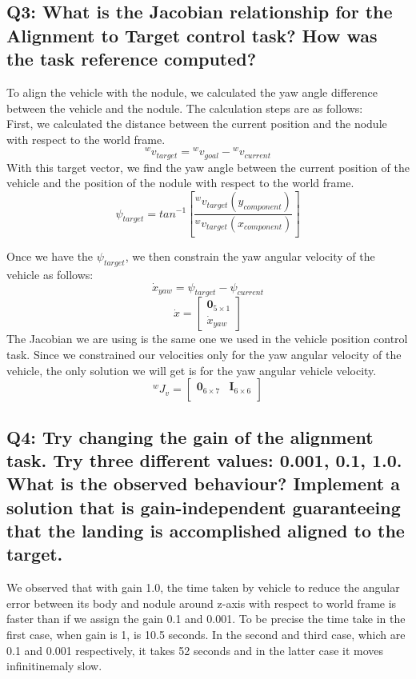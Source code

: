 \documentclass{article}
\begin{document}
\subsection{Q3: What is the Jacobian relationship for the Alignment to Target control task? How was the task reference computed?}
To align the vehicle with the nodule, we calculated the yaw angle difference between the vehicle and the nodule. The calculation steps are as follows:
\\ First, we calculated the distance between the current position and the nodule with respect to the world frame.
$${}^{w}v_{target} = {}^{w}v_{goal} - {}^{w}v_{current} $$  %
\noindent
With this target vector, we find the yaw angle between the current position of the vehicle and the position of the nodule with respect to the world frame. \\
$$\psi_{target} = tan^{-1}\left[\frac{{}^{w}v_{target}(y_{component})}{{}^{w}v_{target}(x_{component})}\right]$$ %

Once we have the $\psi_{target}$, we then constrain the yaw angular velocity of the vehicle as follows:
$$\dot{x}_{yaw}=\psi_{target}-\psi_{current}$$
$$\dot{x} = \begin{bmatrix}
		\mathbf{0}_{5 \times 1} \\ \dot{x}_{yaw}
		\end{bmatrix} $$
The Jacobian we are using is the same one we used in the vehicle position control task. Since we constrained our velocities only for the yaw angular velocity of the vehicle, the only solution we will get is for the yaw angular vehicle velocity. 
$${}^{w}J_v = \begin{bmatrix}
		\mathbf{0}_{6 \times 7} & \mathbf{I}_{6 \times 6} \\
		\end{bmatrix} $$
\subsection{Q4: Try changing the gain of the alignment task. Try three different values: 0.001, 0.1, 1.0. What is the observed behaviour? Implement a solution that is gain-independent guaranteeing that the landing is accomplished aligned to the target.}
We observed that with gain 1.0, the time taken by vehicle to reduce the angular error between its body and nodule around z-axis with respect to world frame is faster than if we assign the gain 0.1 and 0.001. To be precise the time take in the first case, when gain is 1, is 10.5 seconds. In the second and third case, which are 0.1 and 0.001 respectively, it takes 52 seconds and in the latter case it moves infinitinemaly slow. 
\end{document}
